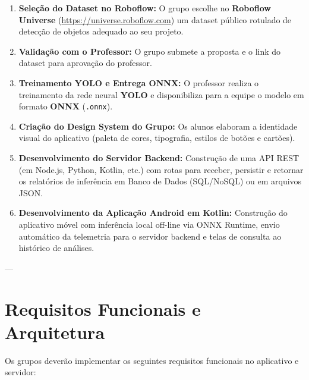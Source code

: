 \documentclass[12pt]{article}
\begin{document}
\begin{enumerate}[label=\textbf{Etapa \arabic*:}]
    \item \textbf{Seleção do Dataset no Roboflow:} O grupo escolhe no \textbf{Roboflow Universe} (\url{https://universe.roboflow.com}) um dataset público rotulado de detecção de objetos adequado ao seu projeto.
    \item \textbf{Validação com o Professor:} O grupo submete a proposta e o link do dataset para aprovação do professor.
    \item \textbf{Treinamento YOLO e Entrega ONNX:} O professor realiza o treinamento da rede neural \textbf{YOLO} e disponibiliza para a equipe o modelo em formato \textbf{ONNX} (\texttt{.onnx}).
    \item \textbf{Criação do Design System do Grupo:} Os alunos elaboram a identidade visual do aplicativo (paleta de cores, tipografia, estilos de botões e cartões).
    \item \textbf{Desenvolvimento do Servidor Backend:} Construção de uma API REST (em Node.js, Python, Kotlin, etc.) com rotas para receber, persistir e retornar os relatórios de inferência em Banco de Dados (SQL/NoSQL) ou em arquivos JSON.
    \item \textbf{Desenvolvimento da Aplicação Android em Kotlin:} Construção do aplicativo móvel com inferência local off-line via ONNX Runtime, envio automático da telemetria para o servidor backend e telas de consulta ao histórico de análises.
\end{enumerate}

---

\section{Requisitos Funcionais e Arquitetura}

Os grupos deverão implementar os seguintes requisitos funcionais no aplicativo e servidor:
\end{document}
